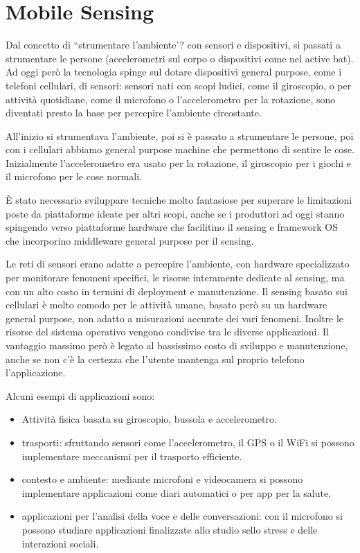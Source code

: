 \chapter{Mobile Sensing}
Dal concetto di ``strumentare l'ambiente'? con sensori e dispositivi, si passati a
strumentare le persone (accelerometri sul corpo o dispositivi come nel active
bat). Ad oggi però la tecnologia spinge sul dotare dispositivi general purpose,
come i telefoni cellulari, di sensori: sensori nati con scopi ludici, come il
giroscopio, o per attività quotidiane, come il microfono o l'accelerometro per
la rotazione, sono diventati presto la base per percepire l'ambiente
circostante.

All'inizio si strumentava l'ambiente, poi si è passato a strumentare le persone,
poi con i cellulari abbiamo general purpose machine che permettono di sentire le
cose. Inizialmente l'accelerometro era usato per la rotazione, il giroscopio per
i giochi e il microfono per le cose normali.

È stato necessario sviluppare tecniche molto fantasiose per superare le
limitazioni poste da piattaforme ideate per altri scopi, anche se i produttori
ad oggi stanno spingendo verso piattaforme hardware che facilitino il sensing e
framework OS che incorporino middleware general purpose per il sensing.

Le reti di sensori erano adatte a percepire l'ambiente, con hardware
specializzato per monitorare fenomeni specifici, le risorse interamente dedicate
al sensing, ma con un alto costo in termini di deployment e manutenzione.
Il sensing basato sui cellulari è molto comodo per le attività umane, basato
però su un hardware general purpose, non adatto a misurazioni accurate dei vari
fenomeni. Inoltre le risorse del sistema operativo vengono condivise tra le
diverse applicazioni. Il vantaggio massimo però è legato al bassissimo costo di
sviluppo e manutenzione, anche se non c'è la certezza che l'utente mantenga sul
proprio telefono l'applicazione.

Alcuni esempi di applicazioni sono:
\begin{itemize}
\item Attività fisica basata su giroscopio, bussola e accelerometro.
\item trasporti: sfruttando sensori come l'accelerometro, il GPS o il WiFi si
possono implementare meccanismi per il trasporto efficiente.
\item contesto e ambiente: mediante microfoni e videocamera si possono
implementare applicazioni come diari automatici o per app per la salute.
\item applicazioni per l'analisi della voce e delle conversazioni: con il
microfono si possono studiare applicazioni finalizzate allo studio sello stress
e delle interazioni sociali.
\end{itemize}

